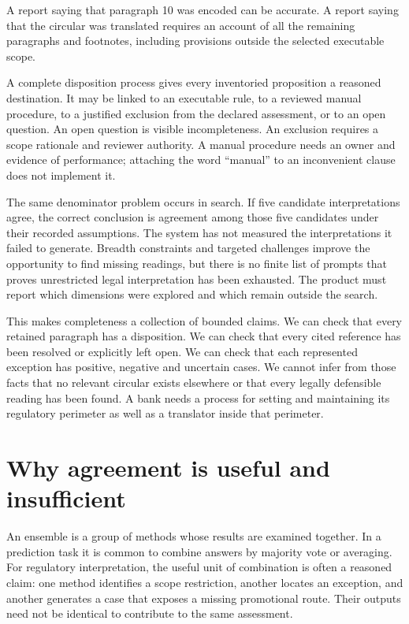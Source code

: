\documentclass[12pt,a4paper,oneside,openany]{book}
\begin{document}
A report saying that paragraph 10 was encoded can be accurate. A report saying that the circular was translated requires an account of all the remaining paragraphs and footnotes, including provisions outside the selected executable scope.


A complete disposition process gives every inventoried proposition a reasoned
destination. It may be linked to an executable rule, to a reviewed manual
procedure, to a justified exclusion from the declared assessment, or to an open
question. An open question is visible incompleteness. An exclusion requires a
scope rationale and reviewer authority. A manual procedure needs an owner and
evidence of performance; attaching the word ``manual'' to an inconvenient clause
does not implement it.

The same denominator problem occurs in search. If five candidate interpretations
agree, the correct conclusion is agreement among those five candidates under
their recorded assumptions. The system has not measured the interpretations it
failed to generate. Breadth constraints and targeted challenges improve the
opportunity to find missing readings, but there is no finite list of prompts
that proves unrestricted legal interpretation has been exhausted. The product
must report which dimensions were explored and which remain outside the search.

This makes completeness a collection of bounded claims. We can check that every
retained paragraph has a disposition. We can check that every cited reference has
been resolved or explicitly left open. We can check that each represented
exception has positive, negative and uncertain cases. We cannot infer from those
facts that no relevant circular exists elsewhere or that every legally
defensible reading has been found. A bank needs a process for setting and
maintaining its regulatory perimeter as well as a translator inside that perimeter.

\section{Why agreement is useful and insufficient}
\label{merge:M01:04}

\label{sec:problem-agreement}
An ensemble is a group of methods whose results are examined together. In a
prediction task it is common to combine answers by majority vote or averaging.
For regulatory interpretation, the useful unit of combination is often a
reasoned claim: one method identifies a scope restriction, another locates an
exception, and another generates a case that exposes a missing promotional route.
Their outputs need not be identical to contribute to the same assessment.
\end{document}
